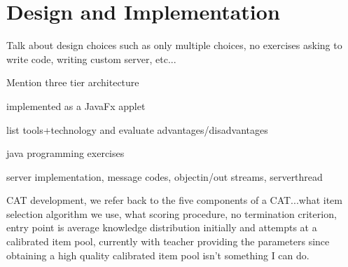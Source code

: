 \chapter{Design and Implementation}
\label{chap:implementation}
Talk about design choices such as only multiple choices, no exercises asking to write code, writing custom server, etc...

Mention three tier architecture

implemented as a JavaFx applet

list tools+technology and evaluate advantages/disadvantages

java programming exercises

server implementation, message codes, objectin/out streams, serverthread


CAT development, we refer back to the five components of a CAT...what item selection algorithm we use, what scoring procedure, no termination criterion, entry point is average knowledge distribution initially and attempts at a calibrated item pool, currently with teacher providing the parameters since obtaining a high quality calibrated item pool isn't something I can do.
\newpage



\newpage



\newpage
